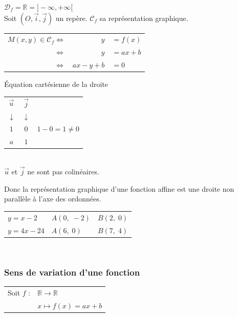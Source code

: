 $\mathscr{D}_f = \mathbb{R} = ] -\infty, +\infty [ $ \\

Soit $ (O, \vec{i}, \vec{j}) $ un repère. $\mathscr{C}_f$ sa représentation graphique.\\

 
\begin{tabular}{r@{$\;$}r@{$\;$}l}
$M(x,y) \in \mathscr{C}_f  
          \Longleftrightarrow $ &        $ y $ & $= f(x) $\\
         $\Longleftrightarrow $ &        $ y $ & $= ax + b$ \\
         $\Longleftrightarrow $ & $ ax -y +b $ & $= 0$ \\                     
\end{tabular}

\'{E}quation cartésienne de la droite 
         
           
\begin{tabular}{|cc|c}
\multicolumn{1}{c}{$\vec{u}$}    &\multicolumn{1}{c}{$\vec{j}$}     & \\
\multicolumn{1}{c}{$\downarrow $}&\multicolumn{1}{c}{$\downarrow $} & \\
$1$ & $0$ & $ 1 - 0 =  1 \neq 0 $ \\
$a$ & $ 1$ &  
\end{tabular}  \\

$\vec{u}$ et $\vec{j}$ ne sont pas colinéaires.

Donc la représentation graphique d'une fonction affine                                           est une droite non parallèle à l'axe des ordonnées. 

\begin{tabular}{l@{$\qquad$}l@{$\quad$}l}
$y=x-2$   & $A(0, \; -2)$ &  $B(2, \; 0)$ \\
$y=4x-24$ & $A(6, \; 0)$  &  $B(7, \; 4)$ \\
\end{tabular}\\

\subsubsection*{Sens de variation d'une fonction}


\begin{tabular}{l@{$\;$ }l}
  Soit $f$ : & $ \mathbb{R} \longrightarrow \mathbb{R}$\\
        & $ x \longmapsto f(x) = ax+b$  \\
\end{tabular}\\

